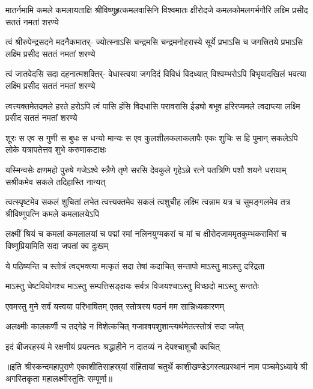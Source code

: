 


\fourlineindentedshloka
{मातर्नमामि कमले कमलायताक्षि}
{श्रीविष्णुहृत्कमलवासिनि विश्वमातः}
{क्षीरोदजे कमलकोमलगर्भगौरि}
{लक्ष्मि प्रसीद सततं नमतां शरण्ये}%

\fourlineindentedshloka
{त्वं श्रीरुपेन्द्रसदने मदनैकमातर्-}
{ज्योत्स्नाऽसि चन्द्रमसि चन्द्रमनोहरास्ये}
{सूर्ये प्रभाऽसि च जगत्त्रितये प्रभाऽसि}
{लक्ष्मि प्रसीद सततं नमतां शरण्ये}%
 

\fourlineindentedshloka
{त्वं जातवेदसि सदा दहनात्मशक्तिर्-}
{वेधास्त्वया जगदिदं विविधं विदध्यात्}
{विश्वम्भरोऽपि बिभृयादखिलं भवत्या}
{लक्ष्मि प्रसीद सततं नमतां शरण्ये}%

\fourlineindentedshloka
{त्वत्त्यक्तमेतदमले हरते हरोऽपि}
{त्वं पासि हंसि विदधासि परावरासि}
{ईड्यो बभूव हरिरप्यमले त्वदाप्त्या}
{लक्ष्मि प्रसीद सततं नमतां शरण्ये}%

\fourlineindentedshloka
{शूरः स एव स गुणी स बुधः स धन्यो}
{मान्यः स एव कुलशीलकलाकलापैः}
{एकः शुचिः स हि पुमान् सकलेऽपि लोके}
{यत्रापतेत्तव शुभे करुणाकटाक्षः}%

\fourlineindentedshloka
{यस्मिन्वसेः क्षणमहो पुरुषे गजेऽश्वे}
{स्त्रैणे तृणे सरसि देवकुले गृहेऽन्ने}
{रत्ने पतत्रिणि पशौ शयने धरायाम्}
{सश्रीकमेव सकले तदिहास्ति नान्यत्}%

\fourlineindentedshloka
{त्वत्स्पृष्टमेव सकलं शुचितां लभेत}
{त्वत्त्यक्तमेव सकलं त्वशुचीह लक्ष्मि}
{त्वन्नाम यत्र च सुमङ्गलमेव तत्र}
{श्रीविष्णुपत्नि कमले कमलालयेऽपि}%

\fourlineindentedshloka
{लक्ष्मीं श्रियं च कमलां कमलालयां च}
{पद्मां रमां नलिनयुग्मकरां च मां च}
{क्षीरोदजाममृतकुम्भकरामिरां च}
{विष्णुप्रियामिति सदा जपतां क्व दुःखम्}%

\twolineshloka
{ये पठिष्यन्ति च स्तोत्रं त्वद्भक्त्या मत्कृतं सदा}
{तेषां कदाचित् सन्तापो माऽस्तु माऽस्तु दरिद्रता}%

\twolineshloka
{माऽस्तु चेष्टवियोगश्च माऽस्तु सम्पत्तिसङ्क्षयः}
{सर्वत्र विजयश्चाऽस्तु विच्छदो माऽस्तु सन्ततेः}%


\twolineshloka
{एवमस्तु मुने सर्वं यत्त्वया परिभाषितम्}
{एतत् स्तोत्रस्य पठनं मम सान्निध्यकारणम्}%

\twolineshloka
{अलक्ष्मीः कालकर्णी च तद्गेहे न विशेत्कचित्}
{गजाश्वपशुशान्त्यर्थमेतत्स्तोत्रं सदा जपेत्}%

\twolineshloka
{इदं बीजरहस्यं मे रक्षणीयं प्रयत्नतः}
{श्रद्धाहीने न दातव्यं न देयश्चाशुचौ क्वचित्}%

॥इति श्रीस्कन्दमहापुराणे एकाशीतिसाहस्र्यां संहितायां चतुर्थे काशीखण्डेऽगस्त्यप्रस्थानं नाम पञ्चमेऽध्याये श्री अगस्तिकृता महालक्ष्मीस्तुतिः सम्पूर्णा॥

